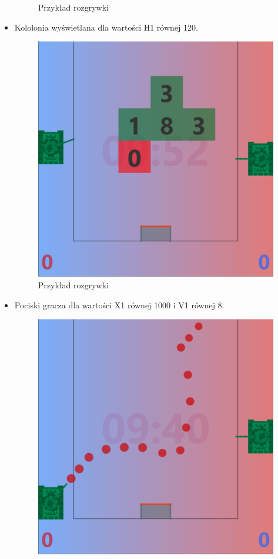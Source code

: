 \documentclass[11pt,a4paper]{report}
\begin{document}
\begin{itemize}
\begin{figure}[!ht]
\caption{ Przykład rozgrywki }
\end{figure}
\newpage
\item{}Kololonia wyświetlana dla wartości H1 równej 120.
\begin{figure}[!ht]
\centerline{\includegraphics{img/rozgrywka3.png}}
\caption{ Przykład rozgrywki }
\end{figure}
\newpage
\item{}Pociski gracza dla wartości X1 równej 1000 i V1 równej 8.
\begin{figure}[!ht]
\centerline{\includegraphics{img/rozgrywka4.png}}

\end{figure}
\end{itemize}
\end{document}

